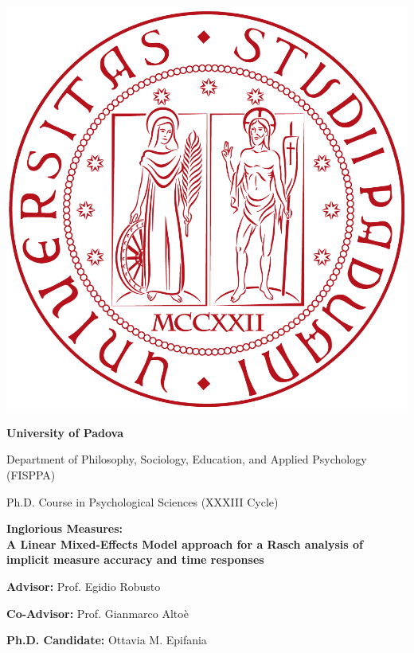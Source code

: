 \documentclass[
]{article}
\author{}
\date{\vspace{-2.5em}}
\begin{document}

	\begin{center}
		\includegraphics[width=0.25\linewidth]{unipd.png}
	\end{center}
	
	\begin{center}
		\begin{Large}
			\textbf{University of Padova}
			
			Department of Philosophy, Sociology, Education, and Applied Psychology (FISPPA)
		\end{Large}
		
	\end{center}
	
	\vspace{3mm}
	\begin{center}
		\begin{large}
			Ph.D. Course in Psychological Sciences (XXXIII Cycle)
		\end{large}
		
		\begin{huge}
			\bfseries
			Inglorious Measures: \\ A Linear Mixed-Effects Model approach for a Rasch analysis of implicit measure accuracy and time responses
		\end{huge}
		
		
	\end{center}
	
	\vspace{2cm}
	\begin{multicols}{2}
		\begin{flushleft}
				\textbf{Advisor:} Prof. Egidio Robusto
				
				\textbf{Co-Advisor:} Prof. Gianmarco Altoè
			
		\end{flushleft}
		\columnbreak
		\begin{flushright}
			\vspace{1.5cm}
			
				\textbf{Ph.D. Candidate:} Ottavia M. Epifania 
			
		\end{flushright}
		
	\end{multicols}
\end{document}
